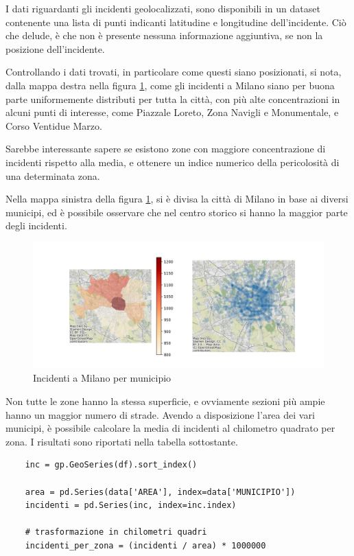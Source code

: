 \documentclass[a4paper,12pt]{report}
\begin{document}
I dati riguardanti gli incidenti geolocalizzati, sono disponibili in un dataset contenente una 
lista di punti indicanti latitudine e longitudine dell'incidente. 
Ciò che delude, è che non è presente nessuna informazione aggiuntiva, se non la posizione 
dell'incidente.

Controllando i dati trovati, in particolare come questi siano posizionati, 
si nota, dalla mappa destra nella figura \ref{fig:heatmap-municipi}, come gli incidenti a Milano 
siano per buona parte uniformemente distributi per tutta la città, 
con più alte concentrazioni in alcuni punti di interesse, come Piazzale Loreto, Zona Navigli 
e Monumentale, e Corso Ventidue Marzo.

Sarebbe interessante sapere se esistono zone con maggiore concentrazione di incidenti rispetto 
alla media, e ottenere un indice numerico della pericolosità di una determinata zona.

Nella mappa sinistra della figura \ref{fig:heatmap-municipi}, si è divisa la città di Milano 
in base ai diversi municipi, ed è possibile osservare che nel centro storico si hanno la 
maggior parte degli incidenti.

\begin{figure}
    \includegraphics[width=\linewidth]{../src/municipi_milano/incidenti_municipio.png}
    \caption{Incidenti a Milano per municipio}
    \label{fig:heatmap-municipi}
\end{figure}

Non tutte le zone hanno la stessa superficie, e ovviamente sezioni più ampie hanno un maggior 
numero di strade. Avendo a disposizione l'area dei vari municipi, 
è possibile calcolare la media di incidenti al chilometro quadrato per zona.
I risultati sono riportati nella tabella sottostante.

\begin{lstlisting}    
    inc = gp.GeoSeries(df).sort_index()

    area = pd.Series(data['AREA'], index=data['MUNICIPIO'])
    incidenti = pd.Series(inc, index=inc.index)

    # trasformazione in chilometri quadri
    incidenti_per_zona = (incidenti / area) * 1000000 
\end{lstlisting}
\end{document}
